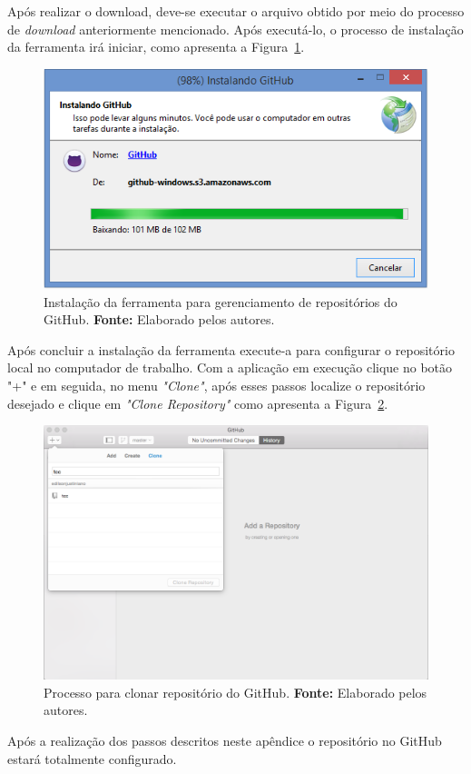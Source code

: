 Após realizar o download, deve-se executar o arquivo obtido por meio do processo de \textit{download} anteriormente mencionado. Após executá-lo, o processo de instalação da ferramenta irá iniciar, como apresenta a Figura~\ref{fig:ap3:instalacao_github_para_windows}.

\captionsetup[figure]{list=no}
\begin{figure}[h!]
	\centerline{\includegraphics[scale=0.5]{./imagens/apendices/instalacao-github-step1.png}}
	\caption[Instalação da ferramenta para gerenciamento de repositórios do GitHub.]
	{Instalação da ferramenta para gerenciamento de repositórios do GitHub. \textbf{Fonte:} Elaborado pelos autores.}
	\label{fig:ap3:instalacao_github_para_windows}
\end{figure}

Após concluir a instalação da ferramenta execute-a para configurar o repositório local no computador de trabalho. Com a aplicação em execução clique no botão "+" e em seguida, no menu \textit{"Clone"}, após esses passos localize o repositório desejado e clique em \textit{"Clone Repository"} como apresenta a Figura~\ref{fig:ap3:clonar_repositorio_github}.

\newpage
\captionsetup[figure]{list=no}
\begin{figure}[h!]
	\centerline{\includegraphics[scale=0.4]{./imagens/apendices/clonar-repositorio-github.png}}
	\caption[Processo para clonar repositório do GitHub.]
	{Processo para clonar repositório do GitHub. \textbf{Fonte:} Elaborado pelos autores.}
	\label{fig:ap3:clonar_repositorio_github}
\end{figure}

Após a realização dos passos descritos neste apêndice o repositório no GitHub estará totalmente configurado.